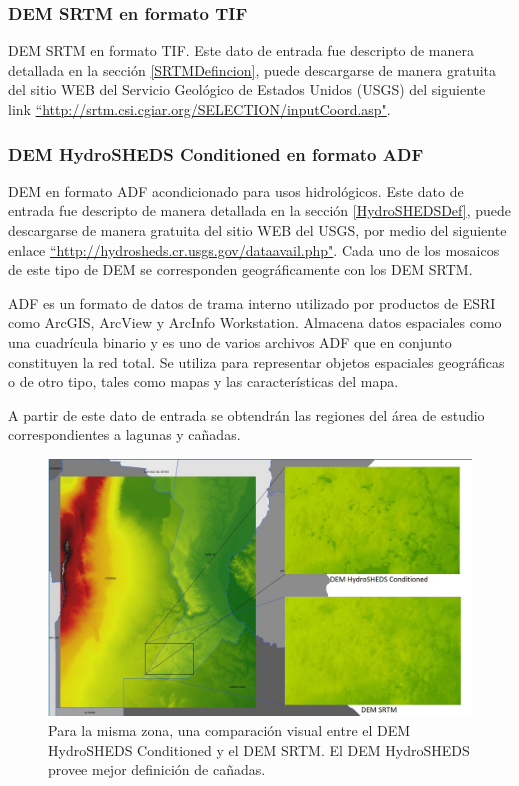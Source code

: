 \documentclass[10pt,a4paper, twoside]{report}
\begin{document}
\subsubsection{DEM SRTM en formato TIF}

DEM SRTM en formato TIF. Este dato de entrada fue descripto de manera detallada en la sección \ref{SRTMDefincion}, puede descargarse de manera gratuita del sitio WEB del Servicio Geológico de Estados Unidos (USGS) del siguiente link  \hyperref[http://srtm.csi.cgiar.org/SELECTION/inputCoord.asp]{``http://srtm.csi.cgiar.org/SELECTION/inputCoord.asp"}.


\subsubsection{DEM HydroSHEDS Conditioned en formato ADF}


DEM en formato ADF acondicionado para usos hidrológicos. Este dato de entrada fue descripto de manera detallada en la sección \ref{HydroSHEDSDef}, puede descargarse de manera gratuita del sitio WEB del USGS, por medio del siguiente enlace  \hyperref[http://hydrosheds.cr.usgs.gov/dataavail.php]{``http://hydrosheds.cr.usgs.gov/dataavail.php"}. Cada uno de los mosaicos de este tipo de DEM se corresponden geográficamente con los DEM SRTM.


ADF es un formato de datos de trama interno utilizado por productos de ESRI como ArcGIS, ArcView y ArcInfo Workstation. Almacena datos espaciales como una cuadrícula binario y es uno de varios archivos ADF que en conjunto constituyen la red total. Se utiliza para representar objetos espaciales geográficas o de otro tipo, tales como mapas y las características del mapa.

A partir de este dato de entrada se obtendrán las regiones del área de estudio correspondientes a lagunas y cañadas.

\begin{figure}[!htb]
   \centering      
   \includegraphics[width=1.0\textwidth]{imagenes/ComparacionHydroSHEDSSRTM.jpg}
 \caption{Para la misma zona, una comparación visual entre el DEM HydroSHEDS Conditioned y el DEM SRTM. El DEM HydroSHEDS provee mejor definición de cañadas.}
 \label{HydroSHEDSSRTM}
\end{figure}
\end{document}
